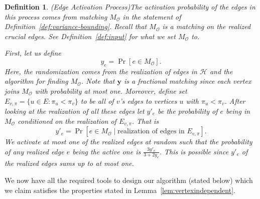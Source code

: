 \documentclass[letterpaper,11pt]{article}
\newcommand{\mc}[1]{\ensuremath{\mathcal{#1}}}
\newtheorem{definition}[lemma]{Definition}
\renewcommand{\mc}[1]{\ensuremath{\mathcal{#1}}}
\begin{document}
\begin{definition}(Edge Activation Process)\label{def:Fuv} The activation probability of the edges in this process comes from matching $M_{\mc{O}}$  in the statement of 
Definition~\ref{def:variance-bounding}. Recall that $M_{\mc{O}}$ is a matching on the realized crucial edges. See Definition~\ref{def:input} for what we set $M_{\mc{O}}$ to.

First, let us define 
\begin{equation}\label{eq:yvjkrgjrg}
    y_e= \Pr[e\in M_{\mc{O}}].
\end{equation}
Here, the randomization comes from the realization of edges in $\mathcal{H}$ and the algorithm for finding $M_\mc{O}$. Note that $\bm{y}$ is a fractional matching since each vertex  joins $M_{\mc{O}}$ with probability at most one. Moreover, define set $E_{v, \pi} = \{u \in E : \pi_u < \pi_v\}$ to be all of $v$'s  edges to vertices $u$ with $\pi_u < \pi_v$. After looking  at the realization of all these edges let $y'_e$ be the probability of $e$ being in $M_{\mc{O}}$ conditioned on the realization of $E_{v, \pi}$. That is 
\begin{equation}\label{eq:kjrkjfr}
    y'_e= \Pr[e\in M_{\mc{O}} \mid  \text{realization of edges  in } E_{v, \pi}].
\end{equation}
We activate at most one of the realized edges at random such that the probability of any realized edge $e$ being the active one is  
 $\frac{3y'_e}{3 + 2y_e}$. This is possible since $y'_e$ of the realized edges sums up to at most one.
\end{definition}

\newcommand{\invperm}{\ensuremath{{\sigma}^{-1}}\xspace}


We now have all the required tools to design our algorithm (stated below) which we claim satisfies the properties stated in Lemma~\ref{lem:vertexindependent}. 
\end{document}
